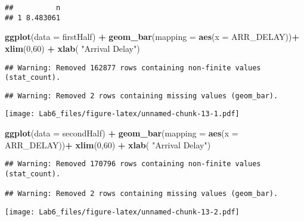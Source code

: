 \documentclass[]{article}
\newenvironment{Shaded}{\begin{snugshade}}{\end{snugshade}}
\newcommand{\KeywordTok}[1]{\textcolor[rgb]{0.13,0.29,0.53}{\textbf{#1}}}
\newcommand{\DataTypeTok}[1]{\textcolor[rgb]{0.13,0.29,0.53}{#1}}
\newcommand{\DecValTok}[1]{\textcolor[rgb]{0.00,0.00,0.81}{#1}}
\newcommand{\StringTok}[1]{\textcolor[rgb]{0.31,0.60,0.02}{#1}}
\newcommand{\OperatorTok}[1]{\textcolor[rgb]{0.81,0.36,0.00}{\textbf{#1}}}
\newcommand{\NormalTok}[1]{#1}
\begin{document}
\begin{verbatim}
##          n
## 1 8.483061
\end{verbatim}

\begin{Shaded}
\begin{Highlighting}[]
\KeywordTok{ggplot}\NormalTok{(}\DataTypeTok{data =}\NormalTok{ firstHalf) }\OperatorTok{+}\StringTok{ }
\StringTok{  }\KeywordTok{geom_bar}\NormalTok{(}\DataTypeTok{mapping =} \KeywordTok{aes}\NormalTok{(}\DataTypeTok{x =}\NormalTok{ ARR_DELAY))}\OperatorTok{+}\StringTok{ }\KeywordTok{xlim}\NormalTok{(}\DecValTok{0}\NormalTok{,}\DecValTok{60}\NormalTok{) }\OperatorTok{+}\StringTok{ }\KeywordTok{xlab}\NormalTok{( }\StringTok{"Arrival Delay"}\NormalTok{)}
\end{Highlighting}
\end{Shaded}

\begin{verbatim}
## Warning: Removed 162877 rows containing non-finite values (stat_count).
\end{verbatim}

\begin{verbatim}
## Warning: Removed 2 rows containing missing values (geom_bar).
\end{verbatim}

\texttt{[image: Lab6\_files/figure-latex/unnamed-chunk-13-1.pdf]}

\begin{Shaded}
\begin{Highlighting}[]
\KeywordTok{ggplot}\NormalTok{(}\DataTypeTok{data =}\NormalTok{ secondHalf) }\OperatorTok{+}\StringTok{ }
\StringTok{  }\KeywordTok{geom_bar}\NormalTok{(}\DataTypeTok{mapping =} \KeywordTok{aes}\NormalTok{(}\DataTypeTok{x =}\NormalTok{ ARR_DELAY))}\OperatorTok{+}\StringTok{ }\KeywordTok{xlim}\NormalTok{(}\DecValTok{0}\NormalTok{,}\DecValTok{60}\NormalTok{) }\OperatorTok{+}\StringTok{ }\KeywordTok{xlab}\NormalTok{( }\StringTok{"Arrival Delay"}\NormalTok{)}
\end{Highlighting}
\end{Shaded}

\begin{verbatim}
## Warning: Removed 170796 rows containing non-finite values (stat_count).

## Warning: Removed 2 rows containing missing values (geom_bar).
\end{verbatim}

\texttt{[image: Lab6\_files/figure-latex/unnamed-chunk-13-2.pdf]}
\end{document}
